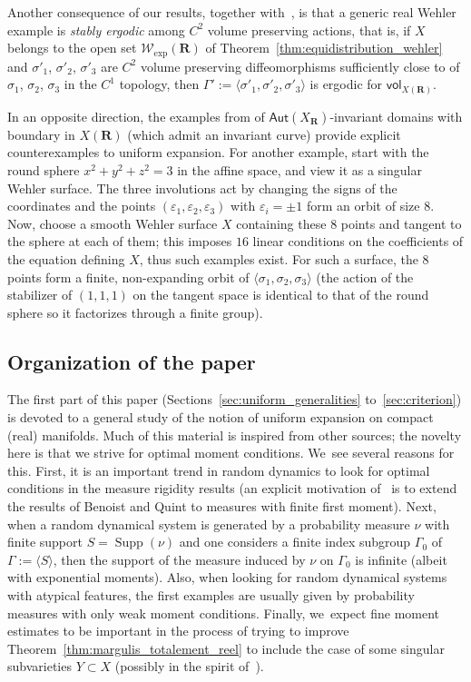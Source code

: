 \documentclass[11pt]{article}
\let\epsilon\varepsilon
\DeclareMathOperator{\supp}{Supp}
\def\R{\mathbf{R}}
\newcommand{\cW}{\mathcal{W}}
\newcommand\Aut{\mathsf{Aut}}
\newcommand{\vol}{{\mathsf{vol}}}
\theoremstyle{plain}
\theoremstyle{definition}
\numberwithin{equation}{section}
\begin{document}
Another consequence of our results, together with~\cite{dolgopyat-krikorian}, is that
a generic real Wehler example is \emph{stably ergodic} among $C^2$ volume preserving actions, that is,
if $X$ belongs to the open set $ \cW_{\mathrm{exp}}(\R)$
of Theorem~\ref{thm:equidistribution_wehler} and
$\sigma'_1$, $\sigma'_2$, $\sigma'_3$ are $C^2$
volume preserving diffeomorphisms sufficiently close to
of $\sigma_1$, $\sigma_2$, $\sigma_3$ in the $C^1$ topology, then
$\Gamma' := \langle \sigma'_1,\sigma'_2,\sigma'_3\rangle $ is ergodic for $\vol_{X(\R)}$.

In an opposite direction, the examples from \cite[\S 9]{invariant} of $\Aut(X_\R)$-invariant
domains with boundary in $X(\R)$ (which admit an invariant curve)
provide explicit counterexamples to uniform expansion.
For another example, start with the round sphere $x^2+y^2+z^2=3$ in the affine space, and view it as a singular
Wehler surface. The three involutions act by changing the signs of the coordinates and the points $(\epsilon_1,\epsilon_2,\epsilon_3)$
with $\epsilon_i=\pm 1$ form an orbit of size $8$. Now, choose a smooth Wehler surface $X$ containing these $8$ points and tangent to the sphere at each of them; this imposes $16$ linear conditions on the coefficients of the equation defining $X$, thus such examples exist.
For such a surface, the $8$ points form a finite, non-expanding orbit of $\langle\sigma_1, \sigma_2, \sigma_3\rangle$ (the action of the stabilizer of $(1,1,1)$ on the tangent space is identical to that of the round sphere so it factorizes through a finite group).

\subsection{Organization of the paper}
The first part of this paper (Sections~\ref{sec:uniform_generalities} to~\ref{sec:criterion}) is
devoted to a general study of the notion of uniform expansion on compact (real) manifolds.
Much of this material is inspired from other sources; the novelty here is that we strive for
optimal moment conditions. We~see several reasons for this. First, it is an important trend
in random dynamics to look for optimal conditions in the measure rigidity results (an explicit motivation of~\cite{Eskin-Lindenstrauss:RandomWalk} is to extend the results of Benoist and Quint to measures with finite first moment). Next,
when a random dynamical system is generated by a probability measure $\nu$ with finite support $S=\supp(\nu)$ and one considers a finite index subgroup $\Gamma_0$ of $\Gamma:=\langle S\rangle$, then the support of the measure induced by $\nu$ on $\Gamma_0$ is infinite (albeit with exponential moments). Also, when looking for random dynamical systems with atypical features, the first examples are usually given by probability measures with only weak moment conditions.
Finally, we~expect fine moment estimates to be important in the process of trying to
improve Theorem~\ref{thm:margulis_totalement_reel} to include the case of some
singular subvarieties $Y\subset X$ (possibly in the spirit of~\hbox{\cite[Th.\,B']{benard-desaxce}}).
\end{document}
